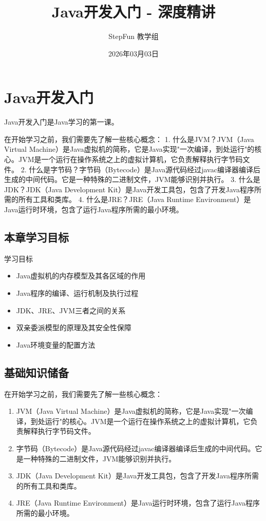 \documentclass[12pt, a4paper]{ctexart}
\title{\textcolor{myblue}{\textbf{Java开发入门 - 深度精讲}}}
\author{StepFun 教学组}
\date{2026年03月03日}
\begin{document}
\thispagestyle{empty}

\section{Java开发入门}

Java开发入门是Java学习的第一课。

在开始学习之前，我们需要先了解一些核心概念：
1. 什么是JVM？JVM（Java Virtual Machine）是Java虚拟机的简称，它是Java实现"一次编译，到处运行"的核心。JVM是一个运行在操作系统之上的虚拟计算机，它负责解释执行字节码文件。
2. 什么是字节码？字节码（Bytecode）是Java源代码经过javac编译器编译后生成的中间代码。它是一种特殊的二进制文件，JVM能够识别并执行。
3. 什么是JDK？JDK（Java Development Kit）是Java开发工具包，包含了开发Java程序所需的所有工具和类库。
4. 什么是JRE？JRE（Java Runtime Environment）是Java运行时环境，包含了运行Java程序所需的最小环境。

\subsection{本章学习目标}

\begin{bluebox}{学习目标}
	\begin{itemize}
		\item {} Java虚拟机的内存模型及其各区域的作用
		\item {} Java程序的编译、运行机制及执行过程
		\item {} JDK、JRE、JVM三者之间的关系
		\item {} 双亲委派模型的原理及其安全性保障
		\item {} Java环境变量的配置方法
	\end{itemize}
\end{bluebox}

\subsection{基础知识储备}

在开始学习之前，我们需要先了解一些核心概念：

\begin{enumerate}
	\item {} JVM（Java Virtual Machine）是Java虚拟机的简称，它是Java实现"一次编译，到处运行"的核心。JVM是一个运行在操作系统之上的虚拟计算机，它负责解释执行字节码文件。

	\item {} 字节码（Bytecode）是Java源代码经过javac编译器编译后生成的中间代码。它是一种特殊的二进制文件，JVM能够识别并执行。

	\item {} JDK（Java Development Kit）是Java开发工具包，包含了开发Java程序所需的所有工具和类库。

	\item {} JRE（Java Runtime Environment）是Java运行时环境，包含了运行Java程序所需的最小环境。
\end{enumerate}
\end{document}
